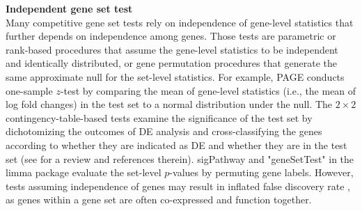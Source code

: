 \documentclass[useAMS,usenatbib, galley]{biom}
\newcommand{\gen}{geneSetTest}
\begin{document}
	
	\textbf{Independent gene set test} \\
	Many competitive gene set tests rely on independence of gene-level statistics that further depends on independence among genes. Those tests are parametric or rank-based procedures that assume the gene-level statistics to be independent and identically distributed, or gene permutation procedures that generate the same approximate null for the set-level statistics. For example, PAGE  \citep{kim2005page} conducts one-sample $z$-test by comparing the mean of gene-level statistics (i.e., the mean of log fold changes) in the test set to a normal distribution under the null. The $2\times 2$ contingency-table-based tests examine the significance of the test set by dichotomizing the outcomes of DE analysis and cross-classifying the genes according to whether they are indicated as DE and whether they are in the test set (see \cite{huang2009bioinformatics} for a review and references therein). sigPathway \citep{tian2005discovering} and "\gen" in the limma package \citep{Smyth2004moderated} evaluate the set-level $p$-values by permuting gene labels. However, tests assuming independence of genes may result in inflated false discovery rate \citep{efron2007testing,goeman2007analyzing, gatti2010heading,wu2012camera,yaari2013quantitative}, as genes within a gene set are often co-expressed and function together.
	
\end{document}
